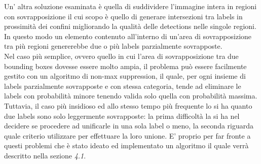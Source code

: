 Un' altra soluzione esaminata è quella di suddividere l'immagine intera in regioni con sovrapposizione il cui scopo è quello di generare intersezioni tra labels in prossimità dei confini migliorando la qualità delle detections nelle singole regioni. In questo modo un elemento contenuto all'interno di un'area di sovrapposizione tra più regioni genererebbe due o più labels parzialmente sovrapposte.\\
Nel caso più semplice, ovvero quello in cui l'area di sovrapposizione tra due bounding boxes dovesse essere molto ampia, il problema può essere facilmente gestito con un algoritmo di non-max suppression, il quale, per ogni insieme di labels parzialmente sovrapposte e con stessa categoria, tende ad eliminare le labels con probabilità minore tenendo valida solo quella con probabilità massima.\\
Tuttavia, il caso più insidioso ed allo stesso tempo più frequente lo si ha quanto due labels sono solo leggermente sovrapposte: la prima difficoltà la si ha nel decidere se procedere ad unificarle in una sola label o meno, la seconda riguarda quale criterio utilizzare per effettuare la loro unione. E' proprio per far fronte a questi problemi che è stato ideato ed implementato un algoritmo il quale verrà descritto nella sezione \textit{4.1}.
